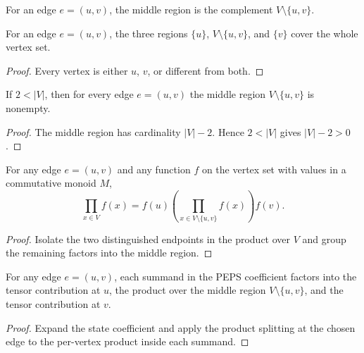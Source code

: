 \begin{definition}%
    \label{def:peps_edgeMiddleVertices}
    \leanok
    For an edge $e = (u,v)$, the middle region is the complement
    $V \setminus \{u,v\}$.
\end{definition}

\begin{theorem}%
    \label{thm:peps_edgeVertices_union}
    \leanok
    For an edge $e = (u,v)$, the three regions $\{u\}$,
    $V \setminus \{u,v\}$, and $\{v\}$ cover the whole vertex set.
\end{theorem}
\begin{proof}\leanok
    Every vertex is either $u$, $v$, or different from both.
\end{proof}

\begin{theorem}%
    \label{thm:peps_edgeMiddleVertices_nonempty_of_two_lt_card}
    \leanok
    If $2<|V|$, then for every edge $e=(u,v)$ the middle region
    $V\setminus\{u,v\}$ is nonempty.
\end{theorem}
\begin{proof}\leanok
    The middle region has cardinality $|V|-2$. Hence
    $2<|V|$ gives $|V|-2>0$.
\end{proof}

\begin{theorem}%
    \label{thm:peps_prod_univ_splitAtEdge}
    \leanok
    For any edge $e = (u,v)$ and any function $f$ on the vertex set with values
    in a commutative monoid $M$,
    \[
        \prod_{x \in V} f(x) = f(u) \left(\prod_{x \in V \setminus \{u,v\}} f(x)\right) f(v).
    \]
\end{theorem}
\begin{proof}\leanok
    Isolate the two distinguished endpoints in the product over $V$ and group
    the remaining factors into the middle region.
\end{proof}

\begin{theorem}%
    \label{thm:peps_stateCoeff_splitAtEdge}
    \leanok
    For any edge $e = (u,v)$, each summand in the PEPS coefficient factors into
    the tensor contribution at $u$, the product over the middle region
    $V \setminus \{u,v\}$, and the tensor contribution at $v$.
\end{theorem}
\begin{proof}\leanok
    Expand the state coefficient and apply the product splitting at the chosen
    edge to the per-vertex product inside each summand.
\end{proof}

